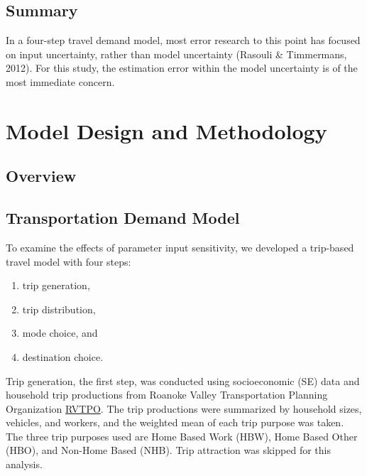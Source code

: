 \documentclass[fancy, masters,twoside]{byuthesis}
\providecommand{\tightlist}{%
  \setlength{\itemsep}{0pt}\setlength{\parskip}{0pt}}
\begin{document}
\hypertarget{summary}{%
\section{Summary}\label{summary}}

In a four-step travel demand model, most error research to this point has focused on input uncertainty, rather than model uncertainty (Rasouli \& Timmermans, 2012). For this study, the estimation error within the model uncertainty is of the most immediate concern.

\hypertarget{model-design-and-methodology}{%
\chapter{Model Design and Methodology}\label{model-design-and-methodology}}

\hypertarget{overview-1}{%
\section{Overview}\label{overview-1}}

\hypertarget{transportation-demand-model}{%
\section{Transportation Demand Model}\label{transportation-demand-model}}

To examine the effects of parameter input sensitivity, we developed a trip-based travel model with four steps:

\begin{enumerate}
\def\labelenumi{\arabic{enumi}.}
\tightlist
\item
  trip generation,
\item
  trip distribution,
\item
  mode choice, and
\item
  destination choice.
\end{enumerate}

Trip generation, the first step, was conducted using socioeconomic (SE) data and household trip productions from Roanoke Valley Transportation Planning Organization \href{https://github.com/xinwangvdot/rvtpo}{RVTPO}. The trip productions were summarized by household sizes, vehicles, and workers, and the weighted mean of each trip purpose was taken. The three trip purposes used are Home Based Work (HBW), Home Based Other (HBO), and Non-Home Based (NHB). Trip attraction was skipped for this analysis.
\end{document}
